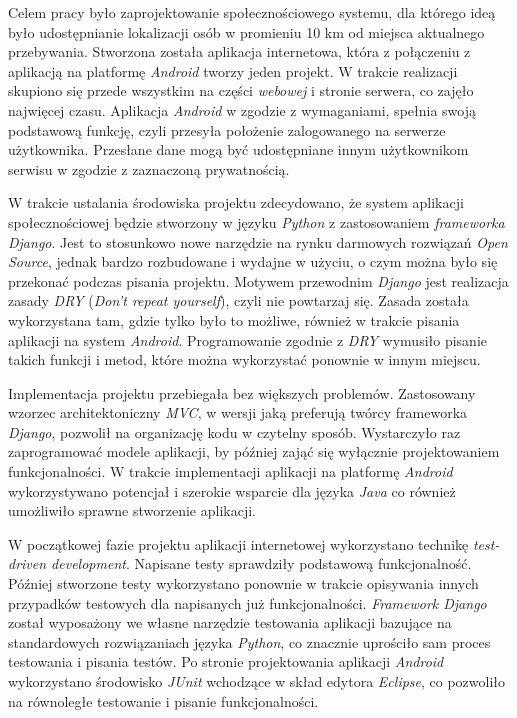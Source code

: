 Celem pracy było zaprojektowanie społecznościowego systemu, dla którego ideą było udostępnianie lokalizacji osób w promieniu 10 km od miejsca aktualnego przebywania. 
Stworzona została aplikacja internetowa, która z połączeniu z aplikacją na platformę \emph{Android} tworzy jeden projekt. W trakcie realizacji skupiono się przede wszystkim na części \emph{webowej} i stronie serwera, co zajęło najwięcej czasu. Aplikacja \emph{Android} w zgodzie z wymaganiami, spełnia swoją podstawową funkcję, czyli przesyła położenie zalogowanego na serwerze użytkownika. Przesłane dane mogą być udostępniane innym użytkownikom serwisu w zgodzie z zaznaczoną prywatnością.

W trakcie ustalania środowiska projektu zdecydowano, że system aplikacji społecznościowej będzie stworzony w języku \emph{Python} z zastosowaniem \emph{frameworka Django}.
Jest to stosunkowo nowe narzędzie na rynku darmowych rozwiązań \emph{Open Source}, jednak bardzo rozbudowane i wydajne w użyciu, o czym można było się przekonać podczas pisania projektu.  Motywem przewodnim \emph{Django} jest realizacja zasady \emph{DRY} (\emph{Don’t repeat yourself}), czyli nie powtarzaj się. Zasada została wykorzystana tam, gdzie tylko było to możliwe, również w trakcie pisania aplikacji na system \emph{Android}. Programowanie zgodnie z \emph{DRY} wymusiło pisanie takich funkcji i metod, które można wykorzystać ponownie w innym miejscu.

Implementacja projektu przebiegała bez większych problemów. Zastosowany wzorzec architektoniczny \emph{MVC}, w wersji jaką preferują twórcy frameworka \emph{Django}, pozwolił na organizację kodu w czytelny sposób. Wystarczyło raz zaprogramować modele aplikacji, by później zająć się wyłącznie projektowaniem funkcjonalności. W trakcie implementacji aplikacji na platformę \emph{Android} wykorzystywano potencjał i szerokie wsparcie dla języka \emph{Java} co również umożliwiło sprawne stworzenie aplikacji.

W początkowej fazie projektu aplikacji internetowej wykorzystano technikę \emph{test-driven development}. Napisane testy sprawdziły podstawową funkcjonalność. Później stworzone testy wykorzystano ponownie w trakcie opisywania innych przypadków testowych dla napisanych już funkcjonalności. \emph{Framework Django} został wyposażony we własne narzędzie testowania aplikacji bazujące na standardowych rozwiązaniach języka \emph{Python}, co znacznie uprościło sam proces testowania i pisania testów.
Po stronie projektowania aplikacji \emph{Android} wykorzystano środowisko \emph{JUnit} wchodzące w skład edytora \emph{Eclipse}, co pozwoliło na równoległe testowanie i pisanie funkcjonalności.

